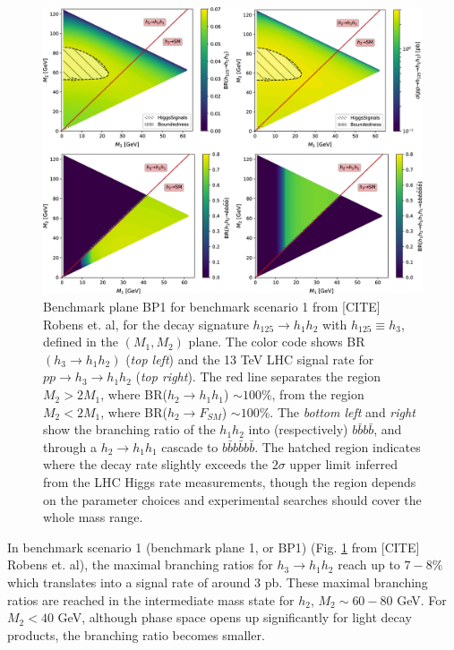\documentclass{article}
\begin{document}
\begin{figure}[ht]
    \centering
    \includegraphics[width=15cm]{figures/Robens-TRSM-Figure-6-BP-1.png}
    \caption{Benchmark plane BP1 for benchmark scenario 1 from [CITE] Robens et. al, for the decay signature $h_{125} \rightarrow h_1 h_2$ with $h_{125} \equiv h_3$, defined in the $(M_1, M_2)$ plane. The color code shows BR$(h_3 \rightarrow h_1 h_2)$ (\textit{top left}) and the 13 TeV LHC signal rate for $pp \rightarrow h_3 \rightarrow h_1 h_2$ (\textit{top right}). The red line separates the region $M_2 > 2 M_1$, where BR($h_2 \rightarrow h_1 h_1$) $\sim 100\%$, from the region $M_2 < 2 M_1$, where BR($h_2 \rightarrow F_{SM}$) $\sim 100\%$. The \textit{bottom left} and \textit{right} show the branching ratio of the $h_1 h_2$ into (respectively) $b\bar{b}b\bar{b}$, and through a $h_2 \rightarrow h_1 h_1$ cascade to $b\bar{b}b\bar{b}b\bar{b}$. The hatched region indicates where the decay rate slightly exceeds the $2\sigma$ upper limit inferred from the LHC Higgs rate measurements, though the region depends on the parameter choices and experimental searches should cover the whole mass range.}
    \label{fig:trsm_bp1}
\end{figure}

In benchmark scenario 1 (benchmark plane 1, or BP1) (Fig. \ref{fig:trsm_bp1} from [CITE] Robens et. al), the maximal branching ratios for $h_3 \rightarrow h_1 h_2$ reach up to $7-8\%$ which translates into a signal rate of around 3 pb. These maximal branching ratios are reached in the intermediate mass state for $h_2$, $M_2 \sim 60 - 80$ GeV. For $M_2 < 40$ GeV, although phase space opens up significantly for light decay products, the branching ratio becomes smaller. 
\end{document}
